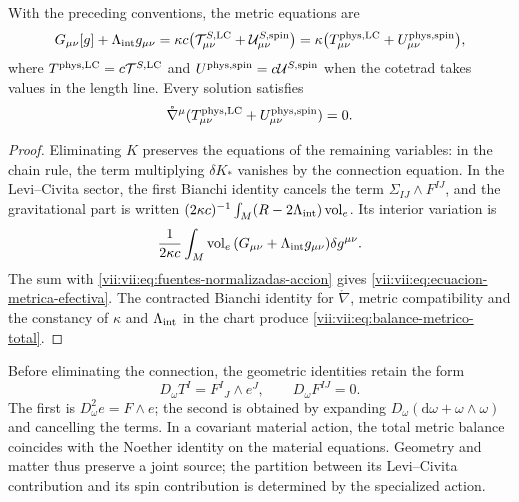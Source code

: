 \begin{proposition}
\label{vii:vii:prop:fuente-metrica-balance}
With the preceding conventions, the metric equations are
\begin{equation}
 G_{\mu\nu}[g]+\Lambda_{\rm int}g_{\mu\nu}
 =\kappa c\bigl(\mathcal T^{S,\rm LC}_{\mu\nu}
                    +\mathcal U^{S,\rm spin}_{\mu\nu}\bigr)
 =\kappa\bigl(T^{\rm phys,LC}_{\mu\nu}
                    +U^{\rm phys,spin}_{\mu\nu}\bigr),
 \label{vii:vii:eq:ecuacion-metrica-efectiva}
\end{equation}
where \(T^{\rm phys,LC}=c\mathcal T^{S,\rm LC}\) and \(U^{\rm phys,spin}=c\mathcal U^{S,\rm spin}\) when the cotetrad takes values in the length line. Every solution satisfies
\begin{equation}
 \mathring\nabla^\mu
   (T^{\rm phys,LC}_{\mu\nu}+U^{\rm phys,spin}_{\mu\nu})=0.
 \label{vii:vii:eq:balance-metrico-total}
\end{equation}
\end{proposition}
\begin{proof}
Eliminating \(K\) preserves the equations of the remaining variables: in the chain rule, the term multiplying \(\delta K_*\) vanishes by the connection equation. In the Levi--Civita sector, the first Bianchi identity cancels the term \(\Sigma_{IJ}\wedge F^{IJ}\), and the gravitational part is written \((2\kappa c)^{-1}\int_M(R-2\Lambda_{\rm int})\operatorname{vol}_e\). Its interior variation is
\[
 \frac1{2\kappa c}\int_M\operatorname{vol}_e\,
        (G_{\mu\nu}+\Lambda_{\rm int}g_{\mu\nu})\delta g^{\mu\nu}.
\]
The sum with \eqref{vii:vii:eq:fuentes-normalizadas-accion} gives
\eqref{vii:vii:eq:ecuacion-metrica-efectiva}. The contracted Bianchi identity
for \(\mathring\nabla\), metric compatibility and
the constancy of \(\kappa\) and \(\Lambda_{\rm int}\) in the chart
produce \eqref{vii:vii:eq:balance-metrico-total}.
\end{proof}

Before eliminating the connection, the geometric identities retain
the form
\begin{equation}
 D_\omega T^I=F^I{}_{J}\wedge e^J,\qquad D_\omega F^{IJ}=0.
 \label{vii:vii:eq:bianchi-cartan}
\end{equation}
The first is \(D_\omega^2e=F\wedge e\); the second is obtained by expanding \(D_\omega(\mathrm d\omega+\omega\wedge\omega)\) and cancelling the terms. In a covariant material action, the total metric balance coincides with the Noether identity on the material equations. Geometry and matter thus preserve a joint source; the partition between its Levi--Civita contribution and its spin contribution is determined by the specialized action.
